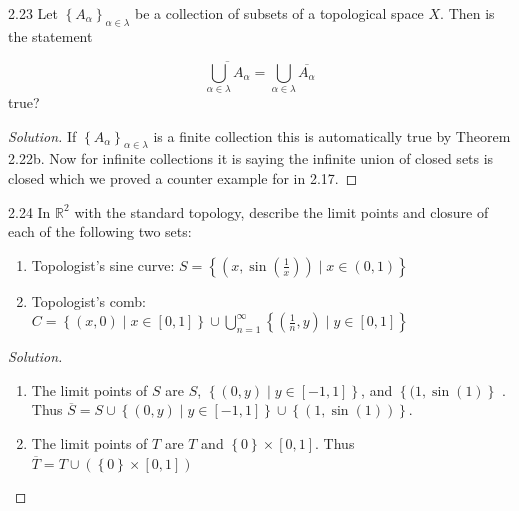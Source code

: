 \documentclass{article}
\newcommand{\R}{\mathbb{R}}
\newenvironment{solution}
{\renewcommand\qedsymbol{$\blacksquare$}\begin{proof}[Solution]}
{\end{proof}}
\begin{document}
\bigskip

\begin{PROB}{2.23}\label{Problem 2.23.}
    Let $\left\{ A_{\alpha} \right\}_{\alpha \in \lambda}$ be a collection of subsets of a topological space $X$. Then is the statement
    
    \begin{equation*}
        \overline{\bigcup_{\alpha \in \lambda} A_{\alpha}} = \bigcup_{\alpha \in \lambda} \overline{A_\alpha}
    \end{equation*}
    true?
\end{PROB}
\begin{solution}
    If $\left\{ A_{\alpha} \right\}_{\alpha \in \lambda}$ is a finite collection this is automatically true by Theorem 2.22b. Now for infinite collections it is saying the infinite union of closed sets is closed which we proved a counter example for in 2.17. 
\end{solution}

\bigskip

\begin{PROB}{2.24}\label{Problem 2.24.}
    In $\R^2$ with the standard topology, describe the limit points and closure of each of the following two sets:
    
    \begin{enumerate}
        \item Topologist's sine curve: $S = \left\{ (x, \sin\left(\frac{1}{x}\right)) \mid x \in (0, 1) \right\}$
        \item Topologist's comb: $C = \left\{ (x, 0) \mid x \in [0, 1] \right\} \cup \bigcup_{n = 1}^{\infty} \left\{ (\frac{1}{n}, y) \mid y \in [0, 1] \right\}$  
    \end{enumerate}
    
\end{PROB}
\begin{solution}
    \begin{enumerate}
        \item The limit points of $S$ are $S$, $\left\{ (0, y) \mid y \in [-1, 1] \right\}$, and $\left\{ (1, \sin(1) \right\}$ . Thus $\overline{S} = S \cup \left\{ (0, y) \mid y \in [-1, 1] \right\} \cup \left\{ (1, \sin(1)) \right\}$. 
        \item The limit points of $T$ are $T$ and $\left\{ 0 \right\} \times [0, 1]$. Thus $\overline{T} = T \cup (\left\{ 0 \right\} \times [0, 1])$      
    \end{enumerate}
\end{solution}
\end{document}
